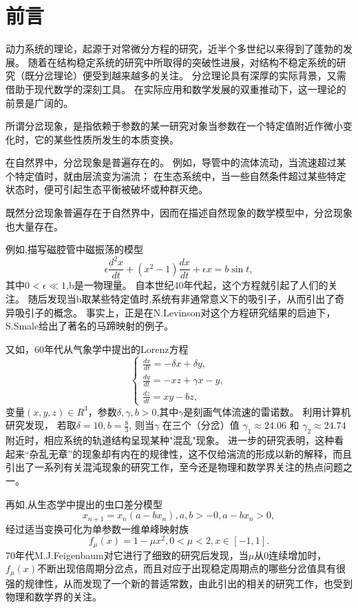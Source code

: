 \section{前言}
  动力系统的理论，起源于对常微分方程的研究，近半个多世纪以来得到了蓬勃的发展。
  随着在结构稳定系统的研究中所取得的突破性进展，对结构不稳定系统的研究（既分岔理论）便受到越来越多的关注。
  分岔理论具有深厚的实际背景，又需借助于现代数学的深刻工具。
  在实际应用和数学发展的双重推动下，这一理论的前景是广阔的。

  
  所谓分岔现象，是指依赖于参数的某一研究对象当参数在一个特定值附近作微小变化时，它的某些性质所发生的本质变换。

  
  在自然界中，分岔现象是普遍存在的。
  例如，导管中的流体流动，当流速超过某个特定值时，就由层流变为湍流；
  在生态系统中，当一些自然条件超过某些特定状态时，便可引起生态平衡被破坏或种群灭绝。

  
  既然分岔现象普遍存在于自然界中，因而在描述自然现象的数学模型中，分岔现象也大量存在。

  
  例如,描写磁腔管中磁振荡的模型
  \[\epsilon \frac{d^2x}{dt}+(x^2-1)\frac{dx}{dt}+\epsilon x=b\sin t ,\]
  其中\(0<\epsilon \ll 1\),b是一物理量。
  自本世纪40年代起，这个方程就引起了人们的关注。
  随后发现当b取某些特定值时,系统有非通常意义下的吸引子，从而引出了奇异吸引子的概念。
  事实上，正是在N.Levinson对这个方程研究结果的启迪下，S.Smale给出了著名的马蹄映射的例子。

  
  又如，60年代从气象学中提出的Lorenz方程
  \begin{equation*}
    \left\{
      \begin{aligned}
        \frac{dx}{dt}=-\delta x+\delta y,\\
        \frac{dy}{dt}=-xz+\gamma x-y,\\
        \frac{dz}{dt}=xy-bz,
      \end{aligned}
            \right.
    \end{equation*}
变量\((x,y,z)\in R^3\)，参数\(\delta,\gamma,b>0\),其中\(\gamma\)是刻画气体流速的雷诺数。
利用计算机研究发现，
若取\(\delta =10,b=\frac{8}{3}\),
则当\(\gamma\) 在三个（分岔）值 \(\gamma_1 \approx 24.06\)
和 \(\gamma_2 \approx 24.74\) 附近时，相应系统的轨道结构呈现某种"混乱"现象。
进一步的研究表明，这种看起来“杂乱无章”的现象却有内在的规律性，这不仅给湍流的形成以新的解释，而且引出了一系列有关混沌现象的研究工作，至今还是物理和数学界关注的热点问题之一。


再如,从生态学中提出的虫口差分模型
\[x_{n+1}=x_n(a-bx_n),a,b>-0,a-bx_n>0,\]
经过适当变换可化为单参数一维单峰映射族
\[f_\mu(x)=1-\mu x^2,0<\mu<2,x\in [-1,1].\]
70年代M.J.Feigenbaum对它进行了细致的研究后发现，当\(\mu\)从0连续增加时，\(f_\mu(x)\)不断出现倍周期分岔点，而且对应于出现稳定周期点的哪些分岔值具有很强的规律性，从而发现了一个新的普适常数，由此引出的相关的研究工作，也受到物理和数学界的关注。



